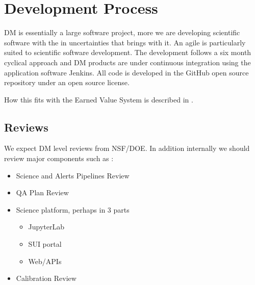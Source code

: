 \section{Development Process} \label{sect:devproc}

DM is essentially a large software project, more we are developing scientific software with the in uncertainties that brings with it. 
An agile \citep{it:agile} is particularly suited to scientific software development.  The development follows a six month  cyclical approach and  DM  products are under continuous
integration using the application software Jenkins. All code is developed in the GitHub open source repository under an open source license.

How this fits with the Earned Value System is described in .

\subsection{Reviews} \label{sect:reviews}
We expect DM level reviews from NSF/DOE. In addition internally we should review major components such as :
\begin{itemize}

\item  Science and Alerts Pipelines Review 
\item   QA Plan Review 
  \item  Science platform, perhaps in 3 parts
	\begin{itemize}
	  \item  JupyterLab 
	  \item SUI portal
	  \item Web/APIs
	\end{itemize}
  \item  Calibration Review 

\end{itemize}
